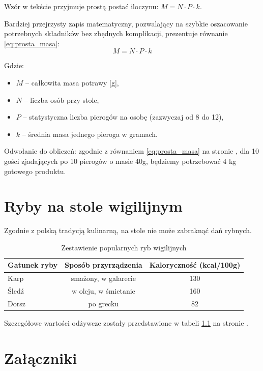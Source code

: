 \documentclass[11pt,a4paper]{report}
\begin{document}
	Wzór w tekście przyjmuje prostą postać iloczynu: $M = N \cdot P \cdot k$.
	
	Bardziej przejrzysty zapis matematyczny, pozwalający na szybkie oszacowanie potrzebnych składników bez zbędnych komplikacji, prezentuje równanie \ref{eq:prosta_masa}:
	\begin{equation}
		M = N \cdot P \cdot k
		\label{eq:prosta_masa}
	\end{equation}
	
	Gdzie:
	\begin{itemize}
		\item $M$ – całkowita masa potrawy [g],
		\item $N$ – liczba osób przy stole,
		\item $P$ – statystyczna liczba pierogów na osobę (zazwyczaj od 8 do 12),
		\item $k$ – średnia masa jednego pieroga w gramach.
	\end{itemize}
	
	Odwołanie do obliczeń: zgodnie z równaniem \ref{eq:prosta_masa} na stronie \pageref{eq:prosta_masa}, dla 10 gości zjadających po 10 pierogów o masie 40g, będziemy potrzebować 4 kg gotowego produktu.
	
	
	\chapter{Ryby na stole wigilijnym}
	Zgodnie z polską tradycją kulinarną, na stole nie może zabraknąć dań rybnych. 
	
	\begin{table}[ht]
		\centering
		\begin{tabular}{|l|c|c|}
			\hline
			\textbf{Gatunek ryby} & \textbf{Sposób przyrządzenia} & \textbf{Kaloryczność (kcal/100g)} \\
			\hline
			Karp & smażony, w galarecie & 130 \\
			Śledź & w oleju, w śmietanie & 160 \\
			Dorsz & po grecku & 82 \\
			\hline
		\end{tabular}
		\caption{Zestawienie popularnych ryb wigilijnych}
		\label{tab:ryby}
	\end{table}
	
	Szczegółowe wartości odżywcze zostały przedstawione w tabeli \ref{tab:ryby} na stronie \pageref{tab:ryby}.
	
	
	\appendix
	\chapter{Załączniki}
\end{document}
